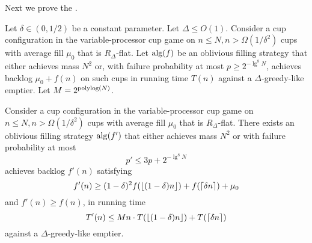 Next we prove the .

\begin{lemma}
  \label{lem:obliviousAmplification} 
  Let $\delta \in (0, 1/2)$ be a constant parameter. Let $\Delta
  \le O(1)$. Consider a cup configuration
  in the variable-processor cup game on $n \le N, n >
  \Omega(1/\delta^2)$ cups with average fill $\mu_0$ that is
  $R_\Delta$-flat. Let $\operatorname{\text{\textup{alg}}}(f)$ be an oblivious filling strategy
  that either achieves mass $N^2$ or, with failure probability at
  most $p\ge 2^{-\lg^8 N}$, achieves backlog $\mu_0 + f(n)$ on such cups
  in running time $T(n)$ against a $\Delta$-greedy-like emptier.
  Let $M = 2^{\operatorname{\text{polylog}}(N)}$.

  Consider a cup configuration in the variable-processor cup game
  on $n \le N, n > \Omega(1/\delta^2)$ cups with average fill
  $\mu_0$ that is $R_\Delta$-flat. There exists an oblivious
  filling strategy $\operatorname{\text{\textup{alg}}}(f')$ that either achieves mass $N^2$ or
  with failure probability at most 
  $$p' \le 3p + 2^{-\lg^8 N}$$
  achieves backlog $f'(n)$ satisfying 
  $$f'(n) \ge (1-\delta)^2 f(\left\lfloor (1-\delta)n \right\rfloor) + f(\left\lceil \delta n \right\rceil) + \mu_0$$ 
  and $f'(n) \ge f(n)$, in running time 
  $$T'(n) \le Mn\cdot T(\left\lfloor (1-\delta)n \right\rfloor) + T(\left\lceil \delta n \right\rceil)$$
  against a $\Delta$-greedy-like emptier.
\end{lemma}

